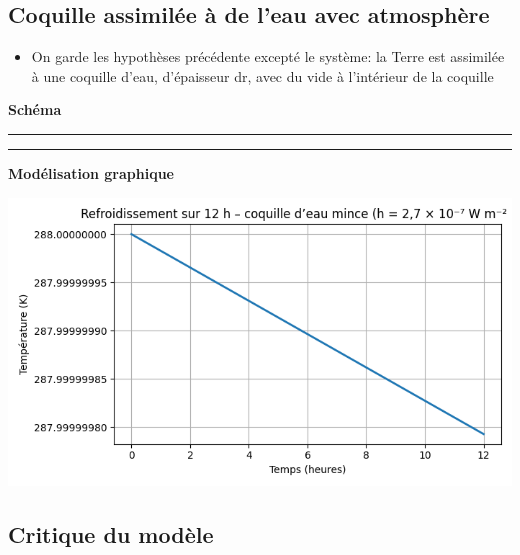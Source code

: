 \documentclass[a4paper,12pt]{article}
\begin{document}
\vspace{1cm}
\subsection{Coquille assimilée à de l'eau avec atmosphère }
\begin{itemize}
    \item On garde les hypothèses précédente excepté le système: la Terre est assimilée à une coquille d'eau, d'épaisseur dr, avec du vide à l'intérieur de la coquille \end{itemize}
\vspace{1cm}
\textbf{Schéma}
\\
\noindent\textcolor{gray}{\rule{\linewidth}{0.4pt}}

    
\begin{center}
  
\end{center}
\noindent\textcolor{gray}{\rule{\linewidth}{0.4pt}}
\vspace{0.5cm}
\textbf{Modélisation graphique}
\begin{center}
  \includegraphics[width=0.8\linewidth]{../modele2/figures/modele2_coquille.png}
\end{center}
        


\subsection{Critique du modèle}
\end{document}
